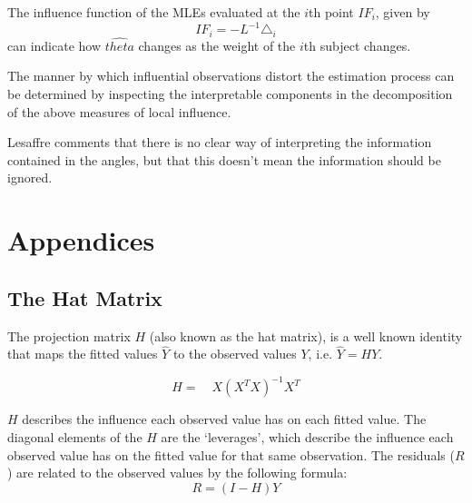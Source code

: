 \documentclass[12pt, a4paper]{article}
\begin{document}
The influence function of the MLEs evaluated at the $i$th point $IF_{i}$, given by
\begin{equation}
IF_{i} = -L^{-1}\triangle _{i}
\end{equation}
can indicate how $\hat{theta}$ changes as the weight of the $i$th
subject changes.

The manner by which influential observations distort the estimation process can be determined by inspecting the
interpretable components in the decomposition of the above measures of local influence.


Lesaffre comments that there is no clear way of interpreting the information contained in the angles, but that this doesn't mean the information should be ignored.


\chapter{Appendices} %
\newpage
\section{The Hat Matrix} %

The projection matrix $H$ (also known as the hat matrix), is a
well known identity that maps the fitted values $\hat{Y}$ to the
observed values $Y$, i.e. $\hat{Y} = HY$.

\begin{equation}
H =\quad X(X^{T}X)^{-1}X^{T}
\end{equation}

$H$ describes the influence each observed value has on each fitted
value. The diagonal elements of the $H$ are the `leverages', which
describe the influence each observed value has on the fitted value
for that same observation. The residuals ($R$) are related to the
observed values by the following formula:
\begin{equation}
R = (I-H)Y
\end{equation}
\end{document}
